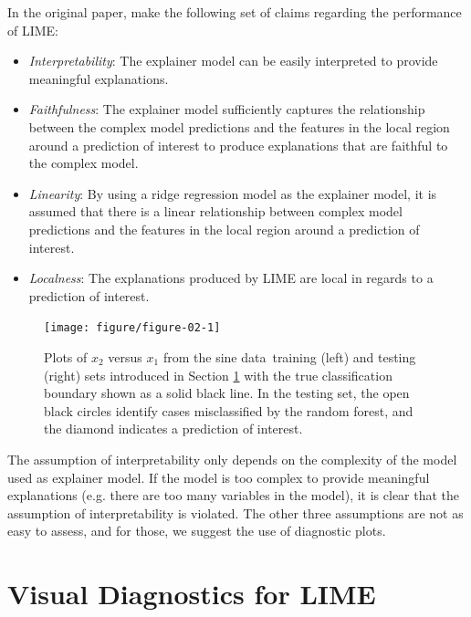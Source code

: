 \documentclass[AMS,STIX2COL]{WileyNJD-v2}\usepackage[]{graphicx}\usepackage[]{color}
\newenvironment{knitrout}{}{} %
\newcommand{\data}{sine data}
\begin{document}
In the original paper, \citet{ribeiro:2016} make the following set of claims regarding the performance of LIME:

\begin{itemize}
\item \emph{Interpretability}: The explainer model can be easily interpreted to provide meaningful explanations.
\item \emph{Faithfulness}: The explainer model sufficiently captures the relationship between the complex model predictions and the features in the local region around a prediction of interest to produce explanations that are faithful to the complex model.
\item \emph{Linearity}: By using a ridge regression model as the explainer model, it is assumed that there is a linear relationship between complex model predictions and the features in the local region around a prediction of interest.
\item \emph{Localness}: The explanations produced by LIME are local in regards to a prediction of interest.
\end{itemize}



\begin{figure}[!thp]
\centering
\begin{knitrout}
\color{fgcolor}

{\centering \texttt{[image: figure/figure-02-1]} 

}



\end{knitrout}
\caption{Plots of $x_2$ versus $x_1$ from the \data \  training (left) and testing (right) sets introduced in Section \ref{diagnostics}  with the true classification boundary  shown as a solid black line.  In the testing set, the open black circles identify cases misclassified by the random forest, and the diamond indicates a prediction of interest. }
\label{fig:figure-02}
\end{figure}

The assumption of interpretability only depends on the complexity of the model used as explainer model. If the model is too complex to provide meaningful explanations (e.g. there are too many variables in the model), it is clear that the assumption of interpretability is violated. The other three assumptions are not as easy to assess, and for those, we suggest the use of diagnostic plots.

\section{Visual Diagnostics for LIME} \label{diagnostics}
\end{document}
